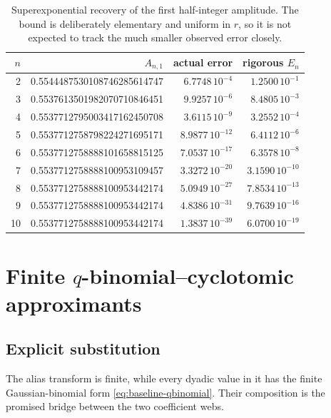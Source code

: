 \documentclass[11pt,oneside]{article}
\theoremstyle{definition}
\theoremstyle{remark}
\begin{document}
\begin{table}[ht]
\centering\small
\begin{tabular}{@{}r r r r@{}}
\toprule
$n$ & $A_{n,1}$ & actual error & rigorous $E_n$ \\
\midrule
2 & 0.5544487530108746285614747 & $6.7748\,10^{-4}$ & $1.2500\,10^{-1}$ \\
3 & 0.5537613501982070710846451 & $9.9257\,10^{-6}$ & $8.4805\,10^{-3}$ \\
4 & 0.5537712795003417162450708 & $3.6115\,10^{-9}$ & $3.2552\,10^{-4}$ \\
5 & 0.5537712758798224271695171 & $8.9877\,10^{-12}$ & $6.4112\,10^{-6}$ \\
6 & 0.5537712758888101658815125 & $7.0537\,10^{-17}$ & $6.3578\,10^{-8}$ \\
7 & 0.5537712758888100953109457 & $3.3272\,10^{-20}$ & $3.1590\,10^{-10}$ \\
8 & 0.5537712758888100953442174 & $5.0949\,10^{-27}$ & $7.8534\,10^{-13}$ \\
9 & 0.5537712758888100953442174 & $4.8386\,10^{-31}$ & $9.7639\,10^{-16}$ \\
10& 0.5537712758888100953442174 & $1.3837\,10^{-39}$ & $6.0700\,10^{-19}$ \\
\bottomrule
\end{tabular}
\caption{Superexponential recovery of the first half-integer amplitude.  The
bound is deliberately elementary and uniform in $r$, so it is not expected to
track the much smaller observed error closely.}
\label{tab:A-convergence}
\end{table}

\section{Finite \texorpdfstring{$q$}{q}-binomial--cyclotomic approximants}\label{sec:q-approximants}

\subsection{Explicit substitution}

The alias transform is finite, while every dyadic value in it has the finite
Gaussian-binomial form \eqref{eq:baseline-qbinomial}.  Their composition is the
promised bridge between the two coefficient webs.
\end{document}
